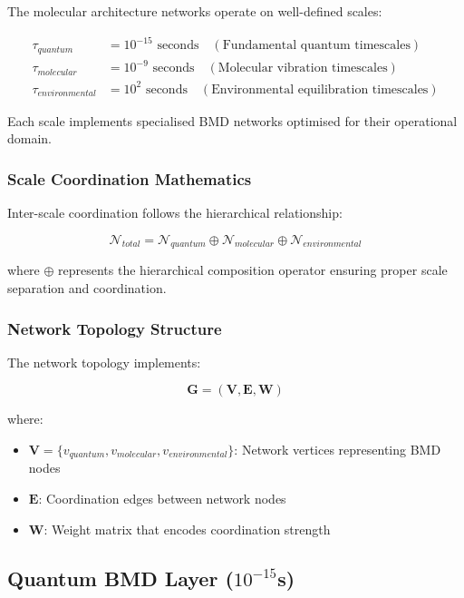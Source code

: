 \documentclass[12pt,a4paper]{article}
\begin{document}
The molecular architecture networks operate on well-defined scales:

\begin{align}
\tau_{quantum} &= 10^{-15} \text{ seconds} \quad (\text{Fundamental quantum timescales}) \\
\tau_{molecular} &= 10^{-9} \text{ seconds} \quad (\text{Molecular vibration timescales}) \\
\tau_{environmental} &= 10^{2} \text{ seconds} \quad (\text{Environmental equilibration timescales})
\end{align}

Each scale implements specialised BMD networks optimised for their operational domain.

\subsubsection{Scale Coordination Mathematics}

Inter-scale coordination follows the hierarchical relationship:

\begin{equation}
\mathcal{N}_{total} = \mathcal{N}_{quantum} \oplus \mathcal{N}_{molecular} \oplus \mathcal{N}_{environmental}
\end{equation}

where $\oplus$ represents the hierarchical composition operator ensuring proper scale separation and coordination.

\subsubsection{Network Topology Structure}

The network topology implements:

\begin{equation}
\mathbf{G} = (\mathbf{V}, \mathbf{E}, \mathbf{W})
\end{equation}

where:
\begin{itemize}
\item $\mathbf{V} = \{v_{quantum}, v_{molecular}, v_{environmental}\}$: Network vertices representing BMD nodes
\item $\mathbf{E}$: Coordination edges between network nodes
\item $\mathbf{W}$: Weight matrix that encodes coordination strength
\end{itemize}

\subsection{Quantum BMD Layer (\texorpdfstring{$10^{-15}$}{10^{-15}}s)}
\end{document}
